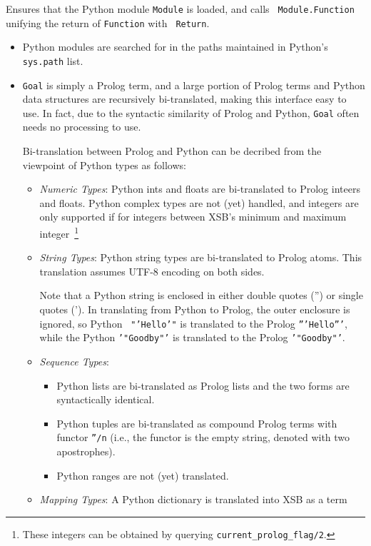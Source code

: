\begin{description}

%
 Ensures that the Python module {\tt Module} is loaded, and calls {\tt
   Module.Function} unifying the return of {\tt Function} with {\tt
   Return}. 

 \begin{itemize}
   \item Python modules are searched for in the paths maintained in
     Python's {\tt sys.path} list.
   \item {\tt Goal} is simply a Prolog term, and a large portion of
     Prolog terms and Python data structures are recursively
     bi-translated, making this interface easy to use.  In fact, due
     to the syntactic similarity of Prolog and Python, {\tt Goal}
     often needs no processing to use.

     Bi-translation between Prolog and Python can be decribed from the
     viewpoint of Python types as follows:
     \begin{itemize}
       \item {\em Numeric Types}: Python ints and floats are
         bi-translated to Prolog inteers and floats.  Python complex
         types are not (yet) handled, and integers are only supported
         if for integers between XSB's minimum and maximum
         integer~\footnote{These integers can be obtained by querying
           {\tt current\_prolog\_flag/2}.}
       \item {\em String Types}: Python string types are bi-translated
         to Prolog atoms.  This translation assumes UTF-8 encoding on
         both sides.

         Note that a Python string is enclosed in either double quotes
         ('') or single quotes (').  In translating from Python to
         Prolog, the outer enclosure is ignored, so Python {\tt
           "'Hello'"} is translated to the Prolog {\tt '''Hello'''},
         while the Python {\tt '"Goodby"'} is  translated to the Prolog
         {\tt '"Goodby"'}.
       \item {\em Sequence Types}:
         \begin{itemize}
           \item Python lists are bi-translated as Prolog lists and
             the two forms are syntactically identical.
           \item Python tuples are bi-translated as compound Prolog
             terms with functor {\tt ''/n} (i.e., the functor is the
             empty string, denoted with two apostrophes).
             \item Python ranges are not (yet) translated.
         \end{itemize}
       \item {\em Mapping Types}: A Python dictionary is translated
         into XSB as a term


\end{itemize}
\end{itemize}
\end{description}
